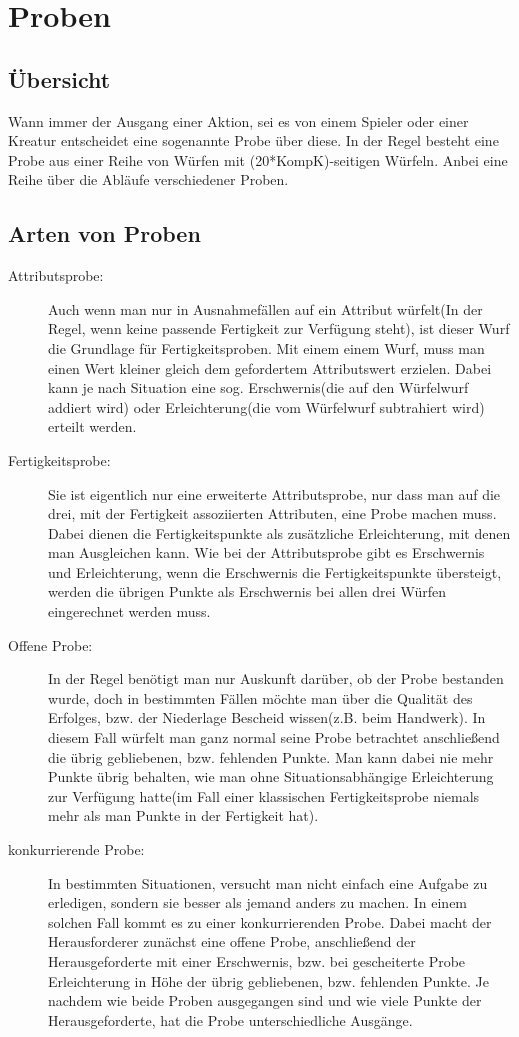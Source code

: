 \documentclass[a4paper,12pt,oneside]{book}
\begin{document}
\chapter{Proben}
\section{Übersicht}
Wann immer der Ausgang einer Aktion, sei es von einem Spieler oder einer Kreatur entscheidet eine sogenannte Probe über diese. In der Regel besteht eine Probe aus einer Reihe von Würfen mit (20*KompK)-seitigen Würfeln. Anbei eine Reihe über die Abläufe verschiedener Proben. 
\section{Arten von Proben}
\begin{description}
\item[Attributsprobe:]Auch wenn man nur in Ausnahmefällen auf ein Attribut würfelt(In der Regel, wenn keine passende Fertigkeit zur Verfügung steht), ist dieser Wurf die Grundlage für Fertigkeitsproben. Mit einem einem Wurf, muss man einen Wert kleiner gleich dem gefordertem Attributswert erzielen. Dabei kann je nach Situation eine sog. Erschwernis(die auf den Würfelwurf addiert wird) oder Erleichterung(die vom Würfelwurf subtrahiert wird) erteilt werden. 
\item[Fertigkeitsprobe:]
Sie ist eigentlich nur eine erweiterte Attributsprobe, nur dass man auf die drei, mit der Fertigkeit assoziierten Attributen, eine Probe machen muss. Dabei dienen die Fertigkeitspunkte als zusätzliche Erleichterung, mit denen man Ausgleichen kann. Wie bei der Attributsprobe gibt es Erschwernis und Erleichterung, wenn die Erschwernis die Fertigkeitspunkte übersteigt, werden die übrigen Punkte als Erschwernis bei allen drei Würfen eingerechnet werden muss.
\item[Offene Probe:]
In der Regel benötigt man nur Auskunft darüber, ob der Probe bestanden wurde, doch in bestimmten Fällen möchte man über die Qualität des Erfolges, bzw. der Niederlage Bescheid wissen(z.B. beim Handwerk). In diesem Fall würfelt man ganz normal seine Probe betrachtet anschließend die übrig gebliebenen, bzw. fehlenden Punkte. Man kann dabei nie mehr Punkte übrig behalten, wie man ohne Situationsabhängige Erleichterung zur Verfügung hatte(im Fall einer klassischen Fertigkeitsprobe niemals mehr als man Punkte in der Fertigkeit hat).
\item[konkurrierende Probe:]
In bestimmten Situationen, versucht man nicht einfach eine Aufgabe zu erledigen, sondern sie besser als jemand anders zu machen. In einem solchen Fall kommt es zu einer konkurrierenden Probe. Dabei macht der Herausforderer zunächst eine offene Probe, anschließend der Herausgeforderte mit einer Erschwernis, bzw. bei gescheiterte Probe Erleichterung in Höhe der übrig gebliebenen, bzw. fehlenden Punkte. Je nachdem wie beide Proben ausgegangen sind und wie viele Punkte der Herausgeforderte, hat die Probe unterschiedliche Ausgänge. 
\end{description}
\end{document}
